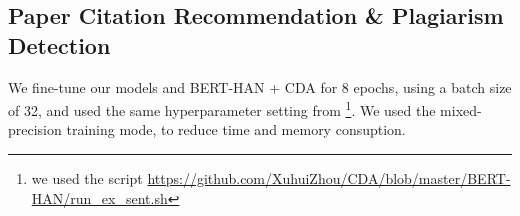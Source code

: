 \documentclass[11pt,a4paper]{article}
\begin{document}
\subsection{Paper Citation Recommendation \& Plagiarism Detection}
\label{subsec:app_aan}
We fine-tune our models and BERT-HAN + CDA for 8 epochs, using a batch size of 32, and used the same hyperparameter setting from \citet[Section~5.2]{zhou-etal-2020-multilevel}\footnote{we used the script \url{https://github.com/XuhuiZhou/CDA/blob/master/BERT-HAN/run_ex_sent.sh}}. We used the mixed-precision training mode, to reduce time and memory consuption. 
\end{document}
